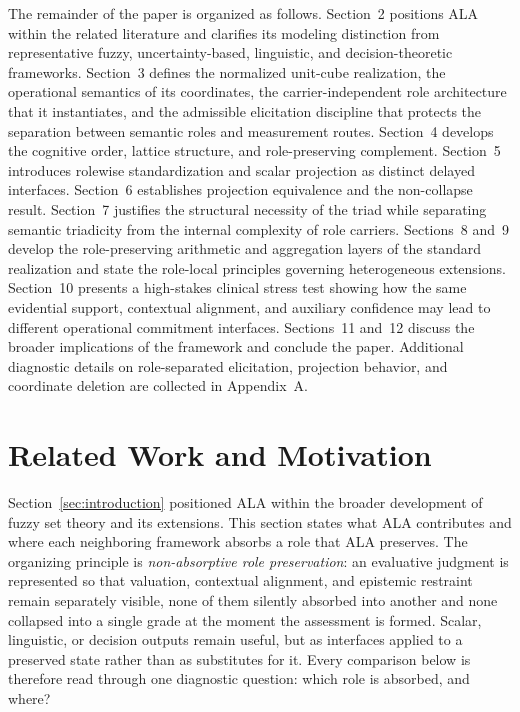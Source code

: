 \documentclass[reqno,final]{amsart}
\theoremstyle{definition}
\theoremstyle{plain}
\theoremstyle{remark}
\begin{document}
The remainder of the paper is organized as follows. Section~2 positions ALA within the related literature and clarifies its modeling distinction from representative fuzzy, uncertainty-based, linguistic, and decision-theoretic frameworks. Section~3 defines the normalized unit-cube realization, the operational semantics of its coordinates, the carrier-independent role architecture that it instantiates, and the admissible elicitation discipline that protects the separation between semantic roles and measurement routes. Section~4 develops the cognitive order, lattice structure, and role-preserving complement. Section~5 introduces rolewise standardization and scalar projection as distinct delayed interfaces. Section~6 establishes projection equivalence and the non-collapse result. Section~7 justifies the structural necessity of the triad while separating semantic triadicity from the internal complexity of role carriers. Sections~8 and~9 develop the role-preserving arithmetic and aggregation layers of the standard realization and state the role-local principles governing heterogeneous extensions. Section~10 presents a high-stakes clinical stress test showing how the same evidential support, contextual alignment, and auxiliary confidence may lead to different operational commitment interfaces. Sections~11 and~12 discuss the broader implications of the framework and conclude the paper. Additional diagnostic details on role-separated elicitation, projection behavior, and coordinate deletion are collected in Appendix~A.


\section{Related Work and Motivation}
\label{sec:related-work}
\label{sec:context-not-enough}
\label{subsec:common-core}
\label{subsec:carrier-honesty}
\label{subsec:per-framework}

Section~\ref{sec:introduction} positioned ALA within the broader development of fuzzy set theory and its extensions. This section states what ALA contributes and where each neighboring framework absorbs a role that ALA preserves. The organizing principle is \emph{non-absorptive role preservation}: an evaluative judgment is represented so that valuation, contextual alignment, and epistemic restraint remain separately visible, none of them silently absorbed into another and none collapsed into a single grade at the moment the assessment is formed. Scalar, linguistic, or decision outputs remain useful, but as interfaces applied to a preserved state rather than as substitutes for it. Every comparison below is therefore read through one diagnostic question: which role is absorbed, and where?
\end{document}
